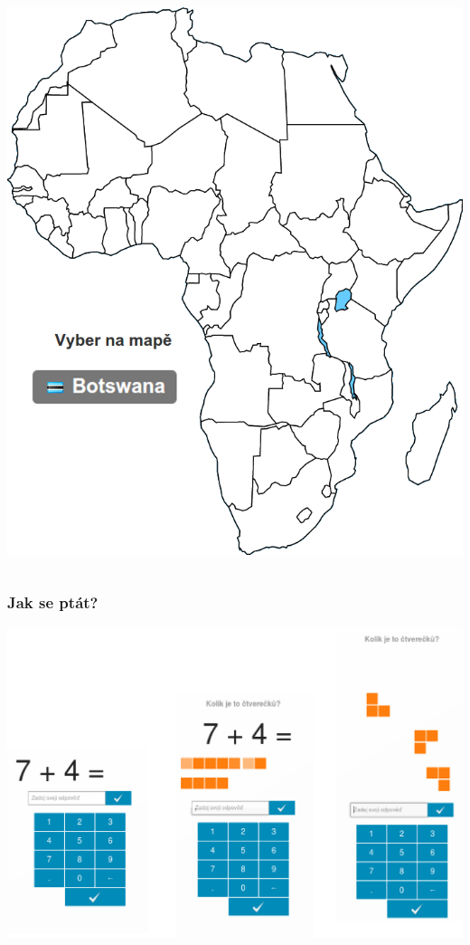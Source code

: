\documentclass[xcolor=svgnames]{beamer}
\begin{document}
\begin{frame}
\begin{columns}
\begin{column}{.5\textwidth}
\begin{center}
				\includegraphics[width=\textwidth]{img/slepemapy_open}
			\end{center}
		\end{column}
	\end{columns}
\end{frame}
\begin{frame}
	\frametitle{Jak se ptát?}
	\begin{center}
		\includegraphics[width=.8\textwidth]{img/matmat_questions}
	\end{center}
\end{frame}
\end{document}
